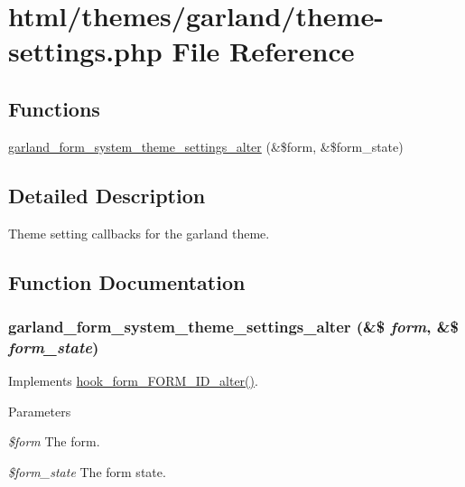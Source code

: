 \hypertarget{theme-settings_8php}{
\section{html/themes/garland/theme-\/settings.php File Reference}
\label{theme-settings_8php}
}
\subsection*{Functions}
\begin{DoxyCompactItemize}
\item 
\hyperlink{theme-settings_8php_a6b4265739628f5ce15e339867b673471}{garland\_\-form\_\-system\_\-theme\_\-settings\_\-alter} (\&\$form, \&\$form\_\-state)
\end{DoxyCompactItemize}


\subsection{Detailed Description}
Theme setting callbacks for the garland theme. 

\subsection{Function Documentation}
\hypertarget{theme-settings_8php_a6b4265739628f5ce15e339867b673471}{
\subsubsection[{garland\_\-form\_\-system\_\-theme\_\-settings\_\-alter}]{\setlength{\rightskip}{0pt plus 5cm}garland\_\-form\_\-system\_\-theme\_\-settings\_\-alter (\&\$ {\em form}, \/  \&\$ {\em form\_\-state})}}
\label{theme-settings_8php_a6b4265739628f5ce15e339867b673471}
Implements \hyperlink{group__hooks_ga8d4a4089551493d55911bd5c4f218264}{hook\_\-form\_\-FORM\_\-ID\_\-alter()}.


\begin{DoxyParams}{Parameters}
\item[{\em \$form}]The form. \item[{\em \$form\_\-state}]The form state. \end{DoxyParams}
